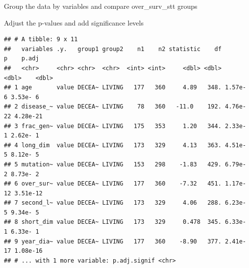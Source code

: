 \documentclass[]{article}
\newenvironment{Shaded}{\begin{snugshade}}{\end{snugshade}}
\newcommand{\KeywordTok}[1]{\textcolor[rgb]{0.13,0.29,0.53}{\textbf{#1}}}
\newcommand{\DataTypeTok}[1]{\textcolor[rgb]{0.13,0.29,0.53}{#1}}
\newcommand{\StringTok}[1]{\textcolor[rgb]{0.31,0.60,0.02}{#1}}
\newcommand{\OperatorTok}[1]{\textcolor[rgb]{0.81,0.36,0.00}{\textbf{#1}}}
\newcommand{\NormalTok}[1]{#1}
\begin{document}
Group the data by variables and compare over\_surv\_stt groups

Adjust the p-values and add significance levels

\begin{Shaded}
\end{Shaded}

\begin{verbatim}
## # A tibble: 9 x 11
##   variables .y.   group1 group2    n1    n2 statistic    df        p    p.adj
##   <chr>     <chr> <chr>  <chr>  <int> <int>     <dbl> <dbl>    <dbl>    <dbl>
## 1 age       value DECEA~ LIVING   177   360     4.89   348. 1.57e- 6 3.53e- 6
## 2 disease_~ value DECEA~ LIVING    78   360   -11.0    192. 4.76e-22 4.28e-21
## 3 frac_gen~ value DECEA~ LIVING   175   353     1.20   344. 2.33e- 1 2.62e- 1
## 4 long_dim  value DECEA~ LIVING   173   329     4.13   363. 4.51e- 5 8.12e- 5
## 5 mutation~ value DECEA~ LIVING   153   298    -1.83   429. 6.79e- 2 8.73e- 2
## 6 over_sur~ value DECEA~ LIVING   177   360    -7.32   451. 1.17e-12 3.51e-12
## 7 second_l~ value DECEA~ LIVING   173   329     4.06   288. 6.23e- 5 9.34e- 5
## 8 short_dim value DECEA~ LIVING   173   329     0.478  345. 6.33e- 1 6.33e- 1
## 9 year_dia~ value DECEA~ LIVING   177   360    -8.90   377. 2.41e-17 1.08e-16
## # ... with 1 more variable: p.adj.signif <chr>
\end{verbatim}
\end{document}
